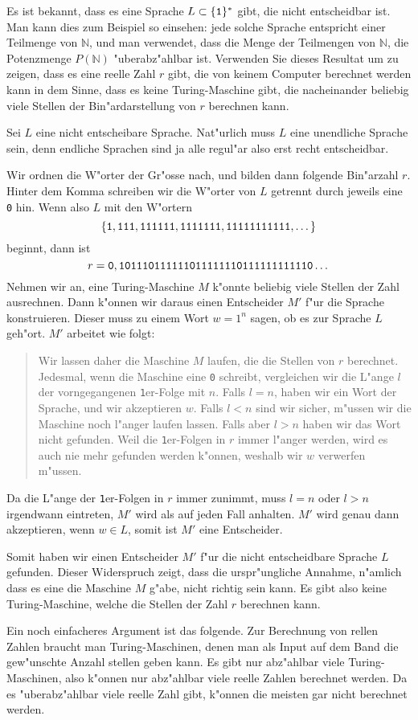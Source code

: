 Es ist bekannt, dass es eine Sprache
$L\subset \{\text{\tt 1}\}^*$ gibt, die nicht entscheidbar ist.
Man kann dies zum Beispiel so einsehen:
jede solche Sprache entspricht einer Teilmenge von $\mathbb N$,
und man verwendet, dass die Menge der Teilmengen von $\mathbb N$,
die Potenzmenge $P(\mathbb N)$ "uberabz"ahlbar ist.
Verwenden Sie dieses
Resultat um zu zeigen, dass es eine reelle Zahl $r$ gibt, die von keinem
Computer berechnet werden kann in dem Sinne, dass es keine Turing-Maschine
gibt, die nacheinander beliebig viele Stellen der Bin"ardarstellung von $r$
berechnen
kann.

\begin{loesung}
Sei $L$ eine nicht entscheibare Sprache. Nat"urlich muss $L$ eine
unendliche Sprache sein, denn endliche Sprachen sind ja alle regul"ar
also erst recht entscheidbar.

Wir ordnen die W"orter der Gr"osse nach, und bilden dann folgende
Bin"arzahl $r$. Hinter dem Komma schreiben wir die W"orter von $L$
getrennt durch jeweils eine {\tt 0} hin. Wenn also $L$ mit
den W"ortern
\[
\{
\text{\tt 1},
\text{\tt 111},
\text{\tt 111111},
\text{\tt 1111111},
\text{\tt 11111111111},
\dots
\}
\]
beginnt, dann ist
\[
r=\text{\tt 0},\text{\tt 101110111111011111110111111111110}\dots
\]
Nehmen wir an, eine Turing-Maschine $M$ k"onnte beliebig viele Stellen
der Zahl ausrechnen. Dann k"onnen wir daraus einen Entscheider $M'$ f"ur
die Sprache konstruieren. Dieser muss zu einem Wort $w=1^n$ sagen,
ob es zur Sprache $L$ geh"ort. $M'$ arbeitet wie folgt:

\begin{quote}
Wir lassen daher die Maschine $M$ laufen, die die Stellen von $r$ berechnet.
Jedesmal, wenn die Maschine eine
{\tt 0} schreibt, vergleichen wir die L"ange $l$ der vorngegangenen
{\tt 1}er-Folge mit $n$. Falls $l=n$, haben wir ein Wort der Sprache,
und wir akzeptieren $w$. Falls $l<n$ sind wir sicher, m"ussen wir
die Maschine noch l"anger laufen lassen. Falls aber $l>n$ haben wir
das Wort nicht gefunden. Weil die {\tt 1}er-Folgen in $r$ immer
l"anger werden, wird es auch nie mehr gefunden werden k"onnen, weshalb
wir $w$ verwerfen m"ussen.
\end{quote}

Da die L"ange der {\tt 1}er-Folgen in $r$ immer zunimmt, muss $l=n$
oder $l>n$ irgendwann eintreten, $M'$ wird als auf jeden Fall
anhalten. $M'$ wird genau dann akzeptieren, wenn $w\in L$, somit
ist $M'$ eine Entscheider.

Somit haben wir einen Entscheider $M'$ f"ur die nicht entscheidbare Sprache
$L$ gefunden. Dieser Widerspruch zeigt, dass die urspr"ungliche Annahme,
n"amlich dass es eine die Maschine $M$ g"abe, nicht richtig sein kann.
Es gibt also keine Turing-Maschine, welche die Stellen der Zahl $r$ berechnen
kann.

Ein noch einfacheres Argument ist das folgende. Zur Berechnung von
rellen Zahlen braucht man Turing-Maschinen, denen man als Input auf
dem Band die gew"unschte Anzahl stellen geben kann. Es gibt nur
abz"ahlbar viele Turing-Maschinen, also k"onnen nur abz"ahlbar viele
reelle Zahlen berechnet werden. Da es "uberabz"ahlbar viele reelle
Zahl gibt, k"onnen die meisten gar nicht berechnet werden.
\end{loesung}
